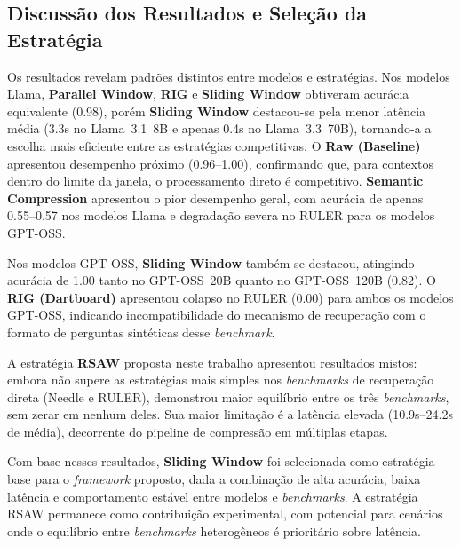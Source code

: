\subsection{Discussão dos Resultados e Seleção da Estratégia}

Os resultados revelam padrões distintos entre modelos e estratégias. Nos modelos Llama, \textbf{Parallel Window}, \textbf{RIG} e \textbf{Sliding Window} obtiveram acurácia equivalente (0.98), porém \textbf{Sliding Window} destacou-se pela menor latência média (3.3s no Llama~3.1~8B e apenas 0.4s no Llama~3.3~70B), tornando-a a escolha mais eficiente entre as estratégias competitivas. O \textbf{Raw (Baseline)} apresentou desempenho próximo (0.96--1.00), confirmando que, para contextos dentro do limite da janela, o processamento direto é competitivo. \textbf{Semantic Compression} apresentou o pior desempenho geral, com acurácia de apenas 0.55--0.57 nos modelos Llama e degradação severa no RULER para os modelos GPT-OSS.

Nos modelos GPT-OSS, \textbf{Sliding Window} também se destacou, atingindo acurácia de 1.00 tanto no GPT-OSS~20B quanto no GPT-OSS~120B (0.82). O \textbf{RIG (Dartboard)} apresentou colapso no RULER (0.00) para ambos os modelos GPT-OSS, indicando incompatibilidade do mecanismo de recuperação com o formato de perguntas sintéticas desse \textit{benchmark}.

A estratégia \textbf{RSAW} proposta neste trabalho apresentou resultados mistos: embora não supere as estratégias mais simples nos \textit{benchmarks} de recuperação direta (Needle e RULER), demonstrou maior equilíbrio entre os três \textit{benchmarks}, sem zerar em nenhum deles. Sua maior limitação é a latência elevada (10.9s--24.2s de média), decorrente do pipeline de compressão em múltiplas etapas.

Com base nesses resultados, \textbf{Sliding Window} foi selecionada como estratégia base para o \textit{framework} proposto, dada a combinação de alta acurácia, baixa latência e comportamento estável entre modelos e \textit{benchmarks}. A estratégia RSAW permanece como contribuição experimental, com potencial para cenários onde o equilíbrio entre \textit{benchmarks} heterogêneos é prioritário sobre latência.
